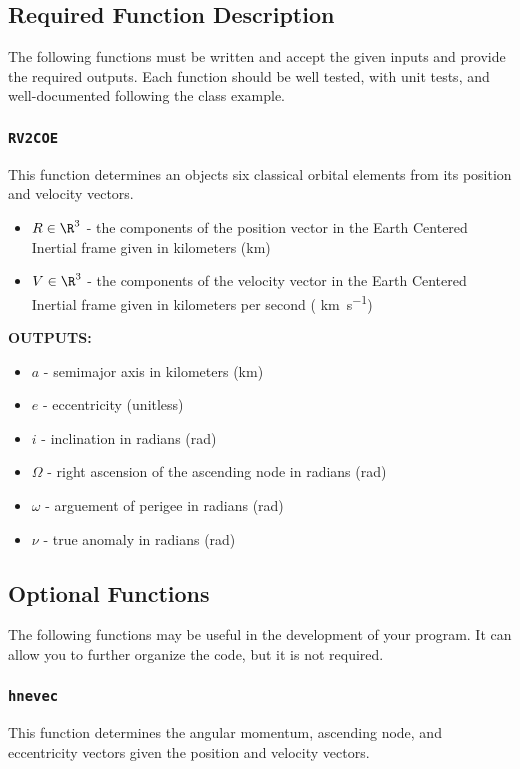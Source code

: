 \documentclass[11pt, reqno]{article}    %
\begin{document}
\subsection*{Required Function Description}

The following functions must be written and accept the given inputs and provide the required outputs. 
Each function should be well tested, with unit tests, and well-documented following the class example.

\subsubsection*{\texttt{RV2COE}}
This function determines an objects six classical orbital elements from its position and velocity vectors.

\begin{itemize}
    \item \( R \in \R^{3} \) - the components of the position vector in the Earth Centered Inertial frame given in kilometers (\si{\kilo\meter})
    \item \( V \in \R^{3} \) - the components of the velocity vector in the Earth Centered Inertial frame given in kilometers per second ( \si{\kilo\meter\per\second})
\end{itemize}

\noindent \textbf{OUTPUTS:}
\begin{itemize}
    \item \( a \)  - semimajor axis in kilometers (\si{\kilo\meter})
    \item \( e \) - eccentricity (unitless)
    \item \( i \) - inclination in radians (\si{\radian})
    \item \( \Omega \) - right ascension of the ascending node in radians (\si{\radian})
    \item \( \omega \) - arguement of perigee in radians (\si{\radian})
    \item \( \nu \) - true anomaly in radians (\si{\radian})
\end{itemize}

\subsection*{Optional Functions}
The following functions may be useful in the development of your program. 
It can allow you to further organize the code, but it is not required.

\subsubsection*{\texttt{hnevec}}
This function determines the angular momentum, ascending node, and eccentricity vectors given the position and velocity vectors.
\end{document}
